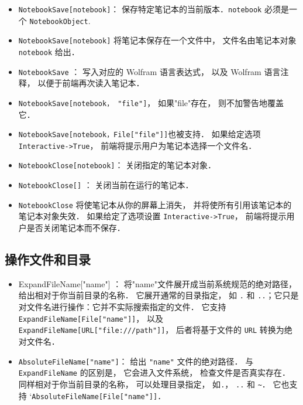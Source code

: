 
\begin{itemize}
\item \verb`NotebookSave[notebook]`： 保存特定笔记本的当前版本．\verb`notebook` 必须是一个 \verb`NotebookObject`.
\item \verb`NotebookSave[notebook]` 将笔记本保存在一个文件中， 文件名由笔记本对象 \verb`notebook` 给出．
\item \verb`NotebookSave` ： 写入对应的 Wolfram 语言表达式， 以及 Wolfram 语言注释， 以便于前端再次读入笔记本．
\item \verb`NotebookSave[notebook， "file"]`， 如果"file"存在， 则不加警告地覆盖它．
\item \verb`NotebookSave[notebook，File["file"]]`也被支持．
如果给定选项 \verb`Interactive->True`， 前端将提示用户为笔记本选择一个文件名．
\item \verb`NotebookClose[notebook]`： 关闭指定的笔记本对象．
\item \verb`NotebookClose[]` ： 关闭当前在运行的笔记本．
\item \verb`NotebookClose` 将使笔记本从你的屏幕上消失， 并将使所有引用该笔记本的笔记本对象失效．
如果给定了选项设置 \verb`Interactive->True`， 前端将提示用户是否关闭笔记本而不保存．
\end{itemize}




\subsection{操作文件和目录}


\begin{itemize}
\item ExpandFileName["name"] ： 将"name"文件展开成当前系统规范的绝对路径， 给出相对于你当前目录的名称．
它展开通常的目录指定， 如 \verb`.` 和 \verb`..`；它只是对文件名进行操作：它并不实际搜索指定的文件．
它支持 \verb`ExpandFileName[File["name"]]`， 以及 \verb`ExpandFileName[URL["file:///path"]]`， 
后者将基于文件的 \verb`URL` 转换为绝对文件名．
\item \verb`AbsoluteFileName["name"]`： 给出 \verb`"name"` 文件的绝对路径． 
与 \verb`ExpandFileName` 的区别是， 它会进入文件系统， 检查文件是否真实存在．
同样相对于你当前目录的名称， 可以处理目录指定， 如\verb`.`， \verb`..` 和 \verb`~`．
它也支持 `\verb`AbsoluteFileName[File["name"]]`．
\end{itemize}

